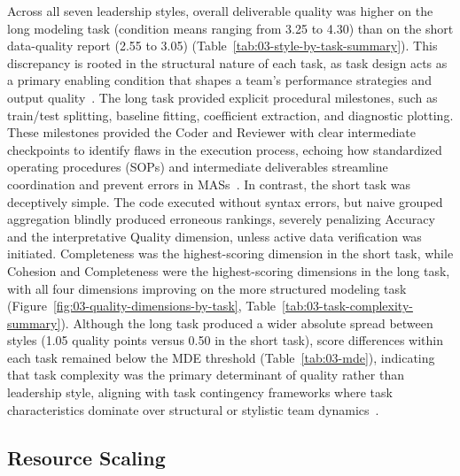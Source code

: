 Across all seven leadership styles, overall deliverable quality was higher on the long modeling task (condition means ranging from 3.25 to 4.30) than on the short data-quality report (2.55 to 3.05) (Table~\ref{tab:03-style-by-task-summary}).
This discrepancy is rooted in the structural nature of each task, as task design acts as a primary enabling condition that shapes a team's performance strategies and output quality~\cite{wageman2005teamdiagnosticsurvey}.
The long task provided explicit procedural milestones, such as train/test splitting, baseline fitting, coefficient extraction, and diagnostic plotting. 
These milestones provided the Coder and Reviewer with clear intermediate checkpoints to identify flaws in the execution process, echoing how standardized operating procedures (SOPs) and intermediate deliverables streamline coordination and prevent errors in \acp{MAS}~\cite{hong2024metagptmetaprogrammingmultiagent}.
In contrast, the short task was deceptively simple.
The code executed without syntax errors, but naive grouped aggregation blindly produced erroneous rankings, severely penalizing Accuracy and the interpretative Quality dimension, unless active data verification was initiated.
Completeness was the highest-scoring dimension in the short task, while Cohesion and Completeness were the highest-scoring dimensions in the long task, with all four dimensions improving on the more structured modeling task (Figure~\ref{fig:03-quality-dimensions-by-task}, Table~\ref{tab:03-task-complexity-summary}).
Although the long task produced a wider absolute spread between styles (1.05 quality points versus 0.50 in the short task), score differences within each task remained below the \ac{MDE} threshold (Table~\ref{tab:03-mde}), 
indicating that task complexity was the primary determinant of quality rather than leadership style, aligning with task contingency frameworks where task characteristics dominate over structural or stylistic team dynamics~\cite{mathieu2017teamwork, muralidharan2025lessonshumanteamsapplied}.

\subsection{Resource Scaling}
\label{subsec:resource-scaling}

